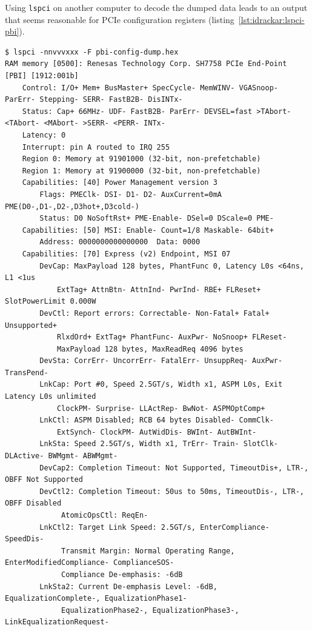 Using \texttt{lspci} on another computer to decode the dumped data leads to an output that seems reasonable for PCIe configuration registers (listing~\ref{lst:idrackar:lspci-pbi}).

\begin{lstlisting}[language={},caption={Parsing of PBI's PCIe configuration with \texttt{lspci}.},label={lst:idrackar:lspci-pbi}]
$ lspci -nnvvvxxx -F pbi-config-dump.hex
RAM memory [0500]: Renesas Technology Corp. SH7758 PCIe End-Point [PBI] [1912:001b]
    Control: I/O+ Mem+ BusMaster+ SpecCycle- MemWINV- VGASnoop- ParErr- Stepping- SERR- FastB2B- DisINTx-
    Status: Cap+ 66MHz- UDF- FastB2B- ParErr- DEVSEL=fast >TAbort- <TAbort- <MAbort- >SERR- <PERR- INTx-
    Latency: 0
    Interrupt: pin A routed to IRQ 255
    Region 0: Memory at 91901000 (32-bit, non-prefetchable)
    Region 1: Memory at 91900000 (32-bit, non-prefetchable)
    Capabilities: [40] Power Management version 3
        Flags: PMEClk- DSI- D1- D2- AuxCurrent=0mA PME(D0-,D1-,D2-,D3hot+,D3cold-)
        Status: D0 NoSoftRst+ PME-Enable- DSel=0 DScale=0 PME-
    Capabilities: [50] MSI: Enable- Count=1/8 Maskable- 64bit+
        Address: 0000000000000000  Data: 0000
    Capabilities: [70] Express (v2) Endpoint, MSI 07
        DevCap: MaxPayload 128 bytes, PhantFunc 0, Latency L0s <64ns, L1 <1us
            ExtTag+ AttnBtn- AttnInd- PwrInd- RBE+ FLReset+ SlotPowerLimit 0.000W
        DevCtl: Report errors: Correctable- Non-Fatal+ Fatal+ Unsupported+
            RlxdOrd+ ExtTag+ PhantFunc- AuxPwr- NoSnoop+ FLReset-
            MaxPayload 128 bytes, MaxReadReq 4096 bytes
        DevSta: CorrErr- UncorrErr- FatalErr- UnsuppReq- AuxPwr- TransPend-
        LnkCap: Port #0, Speed 2.5GT/s, Width x1, ASPM L0s, Exit Latency L0s unlimited
            ClockPM- Surprise- LLActRep- BwNot- ASPMOptComp+
        LnkCtl: ASPM Disabled; RCB 64 bytes Disabled- CommClk-
            ExtSynch- ClockPM- AutWidDis- BWInt- AutBWInt-
        LnkSta: Speed 2.5GT/s, Width x1, TrErr- Train- SlotClk- DLActive- BWMgmt- ABWMgmt-
        DevCap2: Completion Timeout: Not Supported, TimeoutDis+, LTR-, OBFF Not Supported
        DevCtl2: Completion Timeout: 50us to 50ms, TimeoutDis-, LTR-, OBFF Disabled
             AtomicOpsCtl: ReqEn-
        LnkCtl2: Target Link Speed: 2.5GT/s, EnterCompliance- SpeedDis-
             Transmit Margin: Normal Operating Range, EnterModifiedCompliance- ComplianceSOS-
             Compliance De-emphasis: -6dB
        LnkSta2: Current De-emphasis Level: -6dB, EqualizationComplete-, EqualizationPhase1-
             EqualizationPhase2-, EqualizationPhase3-, LinkEqualizationRequest-

\end{lstlisting}
